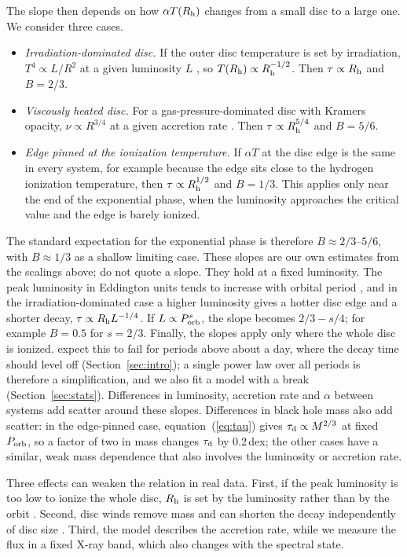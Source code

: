\documentclass[fleqn,usenatbib]{mnras}
\newcommand{\taud}{\tau_{\rm d}}
\newcommand{\porb}{P_{\rm orb}}
\newcommand{\dex}{\,dex}
\begin{document}
The slope then depends on how $\alpha T(R_{\rm h})$ changes from a small disc to a large one. We consider three cases.
\begin{itemize}
\item \textit{Irradiation-dominated disc.} If the outer disc temperature is set by irradiation, $T^4\propto L/R^2$ at a given luminosity $L$ \citep{Dubus1999}, so $T(R_{\rm h})\propto R_{\rm h}^{-1/2}$. Then $\tau\propto R_{\rm h}$ and $B=2/3$.
\item \textit{Viscously heated disc.} For a gas-pressure-dominated disc with Kramers opacity, $\nu\propto R^{3/4}$ at a given accretion rate \citep{ShakuraSunyaev1973,FrankKingRaine2002}. Then $\tau\propto R_{\rm h}^{5/4}$ and $B=5/6$.
\item \textit{Edge pinned at the ionization temperature.} If $\alpha T$ at the disc edge is the same in every system, for example because the edge sits close to the hydrogen ionization temperature, then $\tau\propto R_{\rm h}^{1/2}$ and $B=1/3$. This applies only near the end of the exponential phase, when the luminosity approaches the critical value and the edge is barely ionized.
\end{itemize}
The standard expectation for the exponential phase is therefore $B\approx2/3$--$5/6$, with $B\approx1/3$ as a shallow limiting case. These slopes are our own estimates from the scalings above; \citet{KingRitter1998} do not quote a slope. They hold at a fixed luminosity. The peak luminosity in Eddington units tends to increase with orbital period \citep{Wu2010}, and in the irradiation-dominated case a higher luminosity gives a hotter disc edge and a shorter decay, $\tau\propto R_{\rm h}L^{-1/4}$. If $L\propto\porb^{s}$, the slope becomes $2/3-s/4$; for example $B=0.5$ for $s=2/3$. Finally, the slopes apply only where the whole disc is ionized. \citet{KingRitter1998} expect this to fail for periods above about a day, where the decay time should level off (Section~\ref{sec:intro}); a single power law over all periods is therefore a simplification, and we also fit a model with a break (Section~\ref{sec:stats}). Differences in luminosity, accretion rate and $\alpha$ between systems add scatter around these slopes. Differences in black hole mass also add scatter: in the edge-pinned case, equation~(\ref{eq:tau}) gives $\taud\propto M^{2/3}$ at fixed $\porb$, so a factor of two in mass changes $\taud$ by 0.2\dex; the other cases have a similar, weak mass dependence that also involves the luminosity or accretion rate.

Three effects can weaken the relation in real data. First, if the peak luminosity is too low to ionize the whole disc, $R_{\rm h}$ is set by the luminosity rather than by the orbit \citep{KingRitter1998,Shahbaz1998}. Second, disc winds remove mass and can shorten the decay independently of disc size \citep{Tetarenko2018a,Dubus2019}. Third, the model describes the accretion rate, while we measure the flux in a fixed X-ray band, which also changes with the spectral state.
\end{document}
